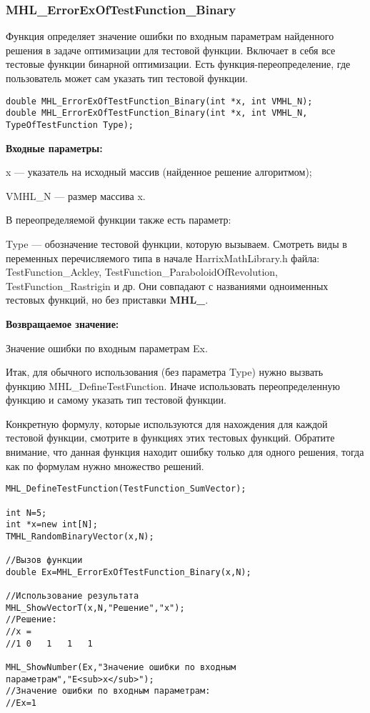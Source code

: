 \documentclass[a4paper,12pt]{article}
\begin{document}
\subsubsection{MHL\_ErrorExOfTestFunction\_Binary}\label{MHL_ErrorExOfTestFunction_Binary}

Функция определяет значение ошибки по входным параметрам найденного решения в задаче оптимизации для тестовой функции. Включает в себя все тестовые функции бинарной оптимизации. Есть функция-переопределение, где пользователь может сам указать тип тестовой функции.


\begin{lstlisting}[label=code_syntax_MHL_ErrorExOfTestFunction_Binary,caption=Синтаксис]
double MHL_ErrorExOfTestFunction_Binary(int *x, int VMHL_N);
double MHL_ErrorExOfTestFunction_Binary(int *x, int VMHL_N, TypeOfTestFunction Type);
\end{lstlisting}

\textbf{Входные параметры:}

x --- указатель на исходный массив (найденное решение алгоритмом);

VMHL\_N --- размер массива x.

В переопределяемой функции также есть параметр:
  
Type --- обозначение тестовой функции, которую вызываем.
Смотреть виды в переменных перечисляемого типа в начале HarrixMathLibrary.h файла: TestFunction\_Ackley, TestFunction\_ParaboloidOfRevolution, TestFunction\_Rastrigin и др. Они совпадают с названиями одноименных тестовых функций, но без приставки \textbf{MHL\_}.

\textbf{Возвращаемое значение:}
 
Значение ошибки по входным параметрам Ex.

Итак, для обычного использования (без параметра Type) нужно вызвать функцию MHL\_DefineTestFunction. Иначе использовать переопределенную функцию и самому указать тип тестовой функции.

Конкретную формулу, которые используются для нахождения для каждой тестовой функции, смотрите в функциях этих тестовых функций. Обратите внимание, что данная функция находит ошибку только для одного решения, тогда как по формулам нужно множество решений.


\begin{lstlisting}[label=code_use_MHL_ErrorExOfTestFunction_Binary,caption=Пример использования]
MHL_DefineTestFunction(TestFunction_SumVector);

int N=5;
int *x=new int[N];
TMHL_RandomBinaryVector(x,N);

//Вызов функции
double Ex=MHL_ErrorExOfTestFunction_Binary(x,N);

//Использование результата
MHL_ShowVectorT(x,N,"Решение","x");
//Решение:
//x =	
//1	0	1	1	1

MHL_ShowNumber(Ex,"Значение ошибки по входным параметрам","E<sub>x</sub>");
//Значение ошибки по входным параметрам:
//Ex=1
\end{lstlisting}
\end{document}
